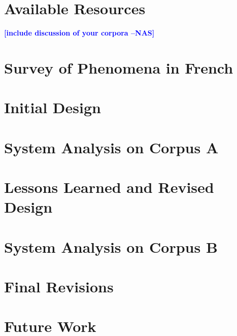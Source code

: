 \documentclass[11pt,letterpaper]{article}
\newcommand{\nascomment}[1]{\textcolor{blue}{\textbf{[#1 --NAS]}}}
\begin{document}
\section{Available Resources}

\nascomment{include discussion of your corpora}

\section{Survey of Phenomena in French}

\section{Initial Design}

\section{System Analysis on Corpus A}

\section{Lessons Learned and Revised Design}

\section{System Analysis on Corpus B}

\section{Final Revisions}

\section{Future Work}







\label{lastpage}
\end{document}
